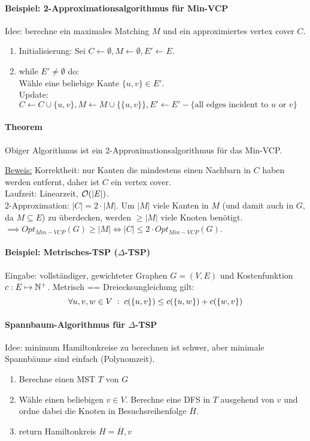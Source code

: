 \paragraph{Beispiel: 2-Approximationsalgorithmus für Min-VCP}
Idee: berechne ein maximales Matching $M$ und ein approximiertes vertex cover $C$.
\begin{enumerate}
    \item Initialisierung: Sei $C \leftarrow \emptyset, M \leftarrow \emptyset, E' \leftarrow E$.
    \item while $E' \neq \emptyset$ do: \\
    Wähle eine beliebige Kante $\{u,v\} \in E'$. \\
    Update: $C \leftarrow C \cup \{u,v\} , M \leftarrow M \cup \{ \{u,v\} \} ,
    E' \leftarrow E' - \{\text{all edges incident to $u$ or $v$}\} $
\end{enumerate}

\paragraph{Theorem}
Obiger Algorithmus ist ein 2-Approximationsalgorithmus für das Min-VCP.

\underline{Beweis:}
Korrektheit: nur Kanten die mindestens einen Nachbarn in $C$ haben werden entfernt, daher ist $C$ ein vertex cover. \\
Laufzeit: Linearzeit, $\mathcal{O}(|E|)$. \\
2-Approximation: $|C| = 2 \cdot |M|$.
Um $|M|$ viele Kanten in $M$ (und damit auch in $G$, da $M \subseteq E$) zu überdecken,
werden $\geq |M|$ viele Knoten benötigt. \\
$ \implies Opt_{Min-VCP}(G) \geq |M| \iff |C| \leq 2 \cdot Opt_{Min-VCP}(G) $.

\paragraph{Beispiel: Metrisches-TSP ($\Delta$-TSP)}
Eingabe: vollständiger, gewichteter Graphen $G=(V,E)$ und Kostenfunktion $c : E \mapsto \mathbb{N}^+$.
Metrisch == Dreiecksungleichung gilt:
$$ \forall u,v,w \in V \; : \; c(\{u,v\}) \leq c(\{u,w\}) + c(\{w,v\}) $$

\paragraph{Spannbaum-Algorithmus für $\Delta$-TSP}
Idee: minimum Hamiltonkreise zu berechnen ist schwer, aber minimale Spannbäume sind einfach (Polynomzeit).
\begin{enumerate}
    \item Berechne einen MST $T$ von $G$
    \item Wähle einen beliebigen $v \in V$.
    Berechne eine DFS in $T$ ausgehend von $v$ und ordne dabei die Knoten in Besuchsreihenfolge $\overline{H}$.
    \item return Hamiltonkreis $H = \overline{H}, v$
\end{enumerate}

